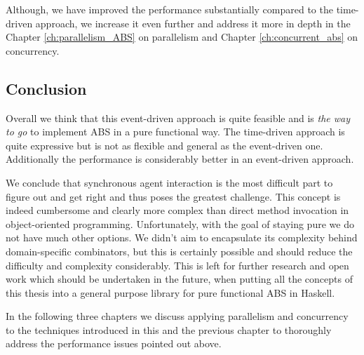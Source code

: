 Although, we have improved the performance substantially compared to the time-driven approach, we increase it even further and address it more in depth in the Chapter \ref{ch:parallelism_ABS} on parallelism and Chapter \ref{ch:concurrent_abs} on concurrency.


\subsection{Conclusion}
Overall we think that this event-driven approach is quite feasible and is \textit{the way to go} to implement ABS in a pure functional way. The time-driven approach is quite expressive but is not as flexible and general as the event-driven one. Additionally the performance is considerably better in an event-driven approach.

We conclude that synchronous agent interaction is the most difficult part to figure out and get right and thus poses the greatest challenge. This concept is indeed cumbersome and clearly more complex than direct method invocation in object-oriented programming. Unfortunately, with the goal of staying pure we do not have much other options. We didn't aim to encapsulate its complexity behind domain-specific combinators, but this is certainly possible and should reduce the difficulty and complexity considerably. This is left for further research and open work which should be undertaken in the future, when putting all the concepts of this thesis into a general purpose library for pure functional ABS in Haskell.

In the following three chapters we discuss applying parallelism and concurrency to the techniques introduced in this and the previous chapter to thoroughly address the performance issues pointed out above.